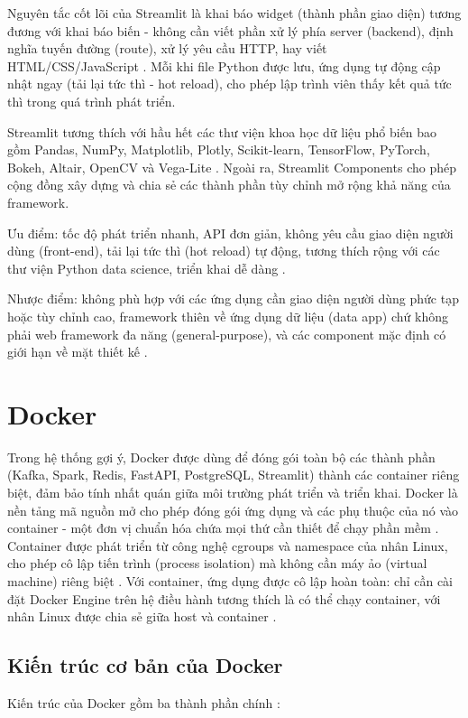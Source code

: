 \documentclass[../BTL.tex]{subfiles}
\begin{document}
Nguyên tắc cốt lõi của Streamlit là khai báo widget (thành phần giao diện) tương đương với khai báo biến - không cần viết phần xử lý phía server (backend), định nghĩa tuyến đường (route), xử lý yêu cầu HTTP, hay viết HTML/CSS/JavaScript \cite{streamlit_official}. Mỗi khi file Python được lưu, ứng dụng tự động cập nhật ngay (tải lại tức thì - hot reload), cho phép lập trình viên thấy kết quả tức thì trong quá trình phát triển.

Streamlit tương thích với hầu hết các thư viện khoa học dữ liệu phổ biến bao gồm Pandas, NumPy, Matplotlib, Plotly, Scikit-learn, TensorFlow, PyTorch, Bokeh, Altair, OpenCV và Vega-Lite \cite{streamlit_official}. Ngoài ra, Streamlit Components cho phép cộng đồng xây dựng và chia sẻ các thành phần tùy chỉnh mở rộng khả năng của framework.

Ưu điểm: tốc độ phát triển nhanh, API đơn giản, không yêu cầu giao diện người dùng (front-end), tải lại tức thì (hot reload) tự động, tương thích rộng với các thư viện Python data science, triển khai dễ dàng \cite{streamlit_official}.

Nhược điểm: không phù hợp với các ứng dụng cần giao diện người dùng phức tạp hoặc tùy chỉnh cao, framework thiên về ứng dụng dữ liệu (data app) chứ không phải web framework đa năng (general-purpose), và các component mặc định có giới hạn về mặt thiết kế \cite{streamlit_official}.


\section{Docker}
Trong hệ thống gợi ý, Docker được dùng để đóng gói toàn bộ các thành phần (Kafka, Spark, Redis, FastAPI, PostgreSQL, Streamlit) thành các container riêng biệt, đảm bảo tính nhất quán giữa môi trường phát triển và triển khai. Docker là nền tảng mã nguồn mở cho phép đóng gói ứng dụng và các phụ thuộc của nó vào container - một đơn vị chuẩn hóa chứa mọi thứ cần thiết để chạy phần mềm \cite{docker_official,docker_wikipedia}. Container được phát triển từ công nghệ cgroups và namespace của nhân Linux, cho phép cô lập tiến trình (process isolation) mà không cần máy ảo (virtual machine) riêng biệt \cite{docker_primer}. Với container, ứng dụng được cô lập hoàn toàn: chỉ cần cài đặt Docker Engine trên hệ điều hành tương thích là có thể chạy container, với nhân Linux được chia sẻ giữa host và container \cite{docker_primer,docker_wikipedia}.

\subsection{Kiến trúc cơ bản của Docker}
Kiến trúc của Docker gồm ba thành phần chính \cite{docker_official}:
\end{document}
